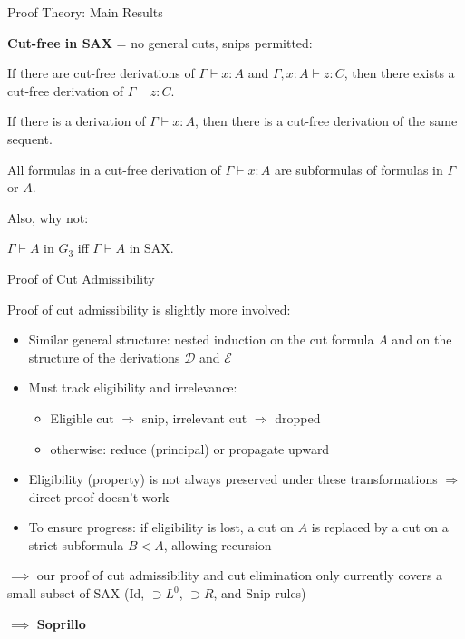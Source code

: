 \documentclass[9ps]{beamer}
\begin{document}
\begin{frame}{Proof Theory: Main Results}
\scriptsize

\textbf{Cut-free in SAX} = no general cuts, snips permitted:
\begin{theorem}
  If there are cut-free derivations of $\Gamma \vdash x : A$ and
  $\Gamma, x : A \vdash z : C$, then there exists a cut-free derivation
  of $\Gamma \vdash z : C$.
\end{theorem}

\begin{theorem}
  If there is a derivation of $\Gamma \vdash x : A$, then there is a cut-free
  derivation of the same sequent. 
\end{theorem}

\begin{theorem}
  All formulas in a cut-free derivation of $\Gamma \vdash x : A$ are
  subformulas of formulas in $\Gamma$ or $A$.
\end{theorem}

\medskip 

Also, why not:
\begin{theorem}
  $\Gamma \vdash A$ in $G_3$ iff $\Gamma \vdash A$ in SAX.
\end{theorem}
\end{frame}


\begin{frame}{Proof of Cut Admissibility}
\scriptsize

Proof of cut admissibility is slightly more involved:
\begin{itemize}
  \item Similar general structure: nested induction on the cut formula $A$ and
    on the structure of the derivations $\mathcal{D}$ and $\mathcal{E}$
  \item Must track eligibility and irrelevance:
    \begin{itemize}
      \item \scriptsize Eligible cut $\Rightarrow$ snip, \quad irrelevant cut
        $\Rightarrow$ dropped
      \item otherwise: reduce (principal) or propagate upward
    \end{itemize}
  \item Eligibility (property) is not always preserved under these
    transformations $\Rightarrow$ direct proof doesn't work
  \item To ensure progress: if eligibility is lost, a cut on $A$ is replaced by
    a cut on a strict subformula $B < A$, allowing recursion
\end{itemize}

\bigskip

$\implies$ our proof of cut admissibility and cut elimination only currently
covers a small subset of SAX (Id, $\supset L^0$, $\supset R$, and Snip rules)

\bigskip

$\implies$ \textbf{Soprillo} 
\end{frame}
\end{document}
